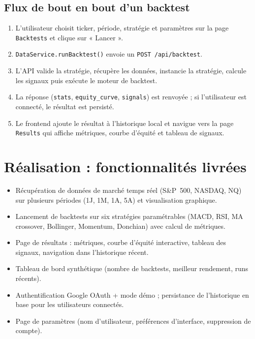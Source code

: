 \documentclass[11pt,a4paper]{article}
\newcommand{\code}[1]{\texttt{#1}}
\begin{document}
\subsection{Flux de bout en bout d'un backtest}
\begin{enumerate}[leftmargin=1.6em]
  \item L'utilisateur choisit ticker, période, stratégie et paramètres sur la page
        \code{Backtests} et clique sur « Lancer ».
  \item \code{DataService.runBacktest()} envoie un \code{POST /api/backtest}.
  \item L'API valide la stratégie, récupère les données, instancie la stratégie,
        calcule les signaux puis exécute le moteur de backtest.
  \item La réponse (\code{stats}, \code{equity\_curve}, \code{signals}) est
        renvoyée ; si l'utilisateur est connecté, le résultat est persisté.
  \item Le frontend ajoute le résultat à l'historique local et navigue vers la page
        \code{Results} qui affiche métriques, courbe d'équité et tableau de signaux.
\end{enumerate}

\section{Réalisation : fonctionnalités livrées}
\begin{itemize}[leftmargin=1.4em]
  \item Récupération de données de marché temps réel (S\&P~500, NASDAQ, NQ) sur
        plusieurs périodes (1J, 1M, 1A, 5A) et visualisation graphique.
  \item Lancement de backtests sur six stratégies paramétrables (MACD, RSI, MA
        crossover, Bollinger, Momentum, Donchian) avec calcul de métriques.
  \item Page de résultats : métriques, courbe d'équité interactive, tableau des
        signaux, navigation dans l'historique récent.
  \item Tableau de bord synthétique (nombre de backtests, meilleur rendement,
        runs récents).
  \item Authentification Google OAuth + mode démo ; persistance de l'historique en
        base pour les utilisateurs connectés.
  \item Page de paramètres (nom d'utilisateur, préférences d'interface, suppression
        de compte).
\end{itemize}
\end{document}
